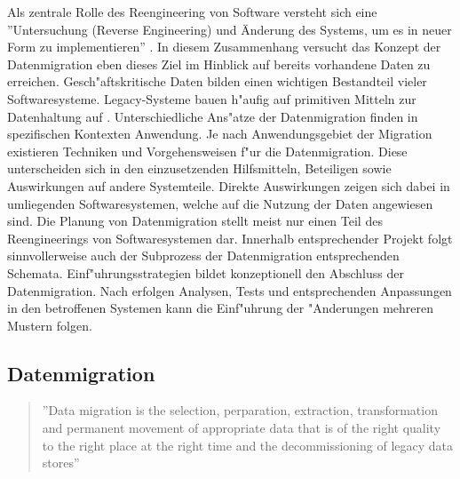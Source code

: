 Als zentrale Rolle des Reengineering von Software versteht sich eine ''Untersuchung (Reverse Engineering) und Änderung des Systems, um es in neuer Form zu implementieren'' \citep{chikofsky-1990}. In diesem Zusammenhang versucht das Konzept der Datenmigration eben dieses Ziel im Hinblick auf bereits vorhandene Daten zu erreichen. Gesch"aftskritische Daten bilden einen wichtigen Bestandteil vieler Softwaresysteme. Legacy-Systeme bauen h"aufig auf primitiven Mitteln zur Datenhaltung auf \citep{henrard-2002}.
\lb 
Unterschiedliche Ans"atze der Datenmigration finden in spezifischen Kontexten Anwendung. Je nach Anwendungsgebiet der Migration existieren Techniken und Vorgehensweisen f"ur die Datenmigration. Diese unterscheiden sich in den einzusetzenden Hilfsmitteln, Beteiligen sowie Auswirkungen auf andere Systemteile. Direkte Auswirkungen zeigen sich dabei in umliegenden Softwaresystemen, welche auf die Nutzung der Daten angewiesen sind.
\lb
Die Planung von Datenmigration stellt meist nur einen Teil des Reengineerings von Softwaresystemen dar. Innerhalb entsprechender Projekt folgt sinnvollerweise auch der Subprozess der Datenmigration entsprechenden Schemata. %
\lb
Einf"uhrungsstrategien bildet konzeptionell den Abschluss der Datenmigration. Nach erfolgen Analysen, Tests und entsprechenden Anpassungen in den betroffenen Systemen kann die Einf"uhrung der "Anderungen mehreren Mustern folgen. 

\subsection{Datenmigration}

\begin{quote}''Data migration is the selection, perparation, extraction, transformation and permanent movement of appropriate data that is of the right quality to the right place at the right time and the decommissioning of legacy data stores'' \flushright\citep[S.~7]{morris-2012}
\end{quote}

